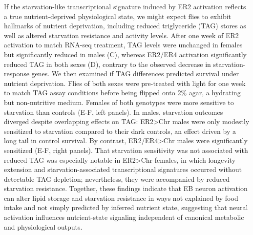 If the starvation-like transcriptional signature induced by ER2 activation reflects a true nutrient-deprived physiological state, we might expect flies to exhibit hallmarks of nutrient deprivation, including reduced triglyceride (TAG) stores as well as altered starvation resistance and activity levels. 
After one week of ER2 activation to match RNA-seq treatment, TAG levels were unchanged in females but significantly reduced in males (C), whereas ER2/ER4 activation significantly reduced TAG in both sexes (D), contrary to the observed decrease in starvation-response genes. 
We then examined if TAG differences predicted survival under nutrient deprivation. 
Flies of both sexes were pre-treated with light for one week to match TAG assay conditions before being flipped onto 2\% agar, a hydrating but non-nutritive medium. 
Females of both genotypes were more sensitive to starvation than controls (E-F, left panels). 
In males, starvation outcomes diverged despite overlapping effects on TAG: ER2>Chr males were only modestly sensitized to starvation compared to their dark controls, an effect driven by a long tail in control survival. By contrast, ER2/ER4>Chr males were significantly sensitized (E-F, right panels). 
That starvation sensitivity was not associated with reduced TAG was especially notable in ER2>Chr females, in which longevity extension and starvation-associated transcriptional signatures occurred without detectable TAG depletion; nevertheless, they were accompanied by reduced starvation resistance. 
Together, these findings indicate that EB neuron activation can alter lipid storage and starvation resistance in ways not explained by food intake and not simply predicted by inferred nutrient state, suggesting that neural activation influences nutrient-state signaling independent of canonical metabolic and physiological outputs.

